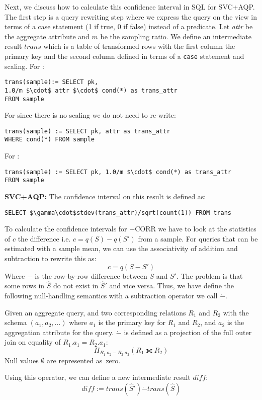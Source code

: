 Next, we discuss how to calculate this confidence interval in SQL for SVC+AQP.
The first step is a query rewriting step where we express the query on the view in terms of a \textsf{case} statement (1 if true, 0 if false)
instead of a predicate.
Let \emph{attr} be the aggregate attribute and $m$ be the sampling ratio. 
We define an intermediate result $trans$ which is a table of transformed rows with the first column the 
primary key and the second column defined in terms of a \texttt{case} statement and scaling.
For \sumfunc:
\begin{lstlisting}[mathescape,basicstyle={\scriptsize}]
trans(sample):= SELECT pk, 
1.0/m $\cdot$ attr $\cdot$ cond(*) as trans_attr
FROM sample 
\end{lstlisting} 
For \avgfunc since there is no scaling we do not need to re-write:
\begin{lstlisting}[mathescape,basicstyle={\scriptsize}]
trans(sample) := SELECT pk, attr as trans_attr 
WHERE cond(*) FROM sample
\end{lstlisting}
For \countfunc:
\begin{lstlisting}[mathescape,basicstyle={\scriptsize}]
trans(sample) := SELECT pk, 1.0/m $\cdot$ cond(*) as trans_attr
FROM sample
\end{lstlisting}

\vspace{0.25em}

\noindent\textbf{SVC+AQP: } The confidence interval on this result is defined 
as:
\begin{lstlisting}[mathescape,basicstyle={\scriptsize}]
SELECT $\gamma\cdot$stdev(trans_attr)/sqrt(count(1)) FROM trans
\end{lstlisting}

\vspace{0.25em}

To calculate the confidence intervals for \svcnospace+CORR we have to look at the statistics of $c$ the difference i.e. $c = q(S) - q(S')$ from a sample.
For queries that can be estimated with a sample mean, we can use the associativity of addition and subtraction to rewrite this as:
\[c = q(S - S')\]
Where $-$ is the row-by-row difference between $S$ and $S'$.
The problem is that some rows in $\widehat{S}$ do not exist in $\widehat{S}'$ and vice versa. 
Thus, we have define the following null-handling semantics with a subtraction operator we call $\dot{-}$.
\begin{definition} Given an aggregate query, and two corresponding relations $R_1$ and $R_2$ with the schema $(a_1, a_2, ...)$ where $a_1$ is the primary key for $R_1$ and $R_2$, and $a_2$ is the aggregation attribute for the query. 
$\dot{-}$ is defined as a projection of the full outer join on equality of $R_1.a_1 = R_2.a_1$: \[ \Pi_{R_1.a_2 - R_2.a_2} ( R_1 \fullouterjoin R_2 ) \]
Null values $\emptyset$ are represented as~zero.
\end{definition}
Using this operator, we can define a new intermediate result $diff$:
\[diff := trans(\widehat{S}') \dot{-} trans(\widehat{S}) \]

